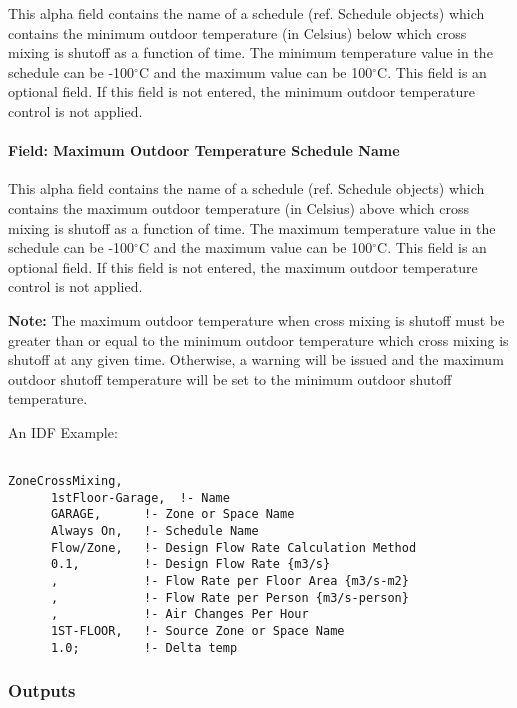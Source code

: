 This alpha field contains the name of a schedule (ref. Schedule objects) which contains the minimum outdoor temperature (in Celsius) below which cross mixing is shutoff as a function of time. The minimum temperature value in the schedule can be -100$^\circ$C and the maximum value can be 100$^\circ$C. This field is an optional field. If this field is not entered, the minimum outdoor temperature control is not applied.

\paragraph{Field: Maximum Outdoor Temperature Schedule Name}\label{field-maximum-outdoor-temperature-schedule-name-3}

This alpha field contains the name of a schedule (ref. Schedule objects) which contains the maximum outdoor temperature (in Celsius) above which cross mixing is shutoff as a function of time. The maximum temperature value in the schedule can be -100$^\circ$C and the maximum value can be 100$^\circ$C. This field is an optional field. If this field is not entered, the maximum outdoor temperature control is not applied.

\textbf{Note:} The maximum outdoor temperature when cross mixing is shutoff must be greater than or equal to the minimum outdoor temperature which cross mixing is shutoff at any given time. Otherwise, a warning will be issued and the maximum outdoor shutoff temperature will be set to the minimum outdoor shutoff temperature.

An IDF Example:

\begin{lstlisting}

ZoneCrossMixing,
      1stFloor-Garage,  !- Name
      GARAGE,      !- Zone or Space Name
      Always On,   !- Schedule Name
      Flow/Zone,   !- Design Flow Rate Calculation Method
      0.1,         !- Design Flow Rate {m3/s}
      ,            !- Flow Rate per Floor Area {m3/s-m2}
      ,            !- Flow Rate per Person {m3/s-person}
      ,            !- Air Changes Per Hour
      1ST-FLOOR,   !- Source Zone or Space Name
      1.0;         !- Delta temp
\end{lstlisting}

\subsubsection{Outputs}\label{outputs-4-000}

